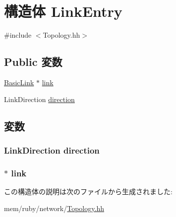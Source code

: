 \hypertarget{structLinkEntry}{
\section{構造体 LinkEntry}
\label{structLinkEntry}
}


{\ttfamily \#include $<$Topology.hh$>$}\subsection*{Public 変数}
\begin{DoxyCompactItemize}
\item 
\hyperlink{classBasicLink}{BasicLink} $\ast$ \hyperlink{structLinkEntry_ae05f4896b500322fa4ef9ea2c854bb8f}{link}
\item 
LinkDirection \hyperlink{structLinkEntry_ac6d812eedeb521eb5c2e65d07b046c4c}{direction}
\end{DoxyCompactItemize}


\subsection{変数}
\hypertarget{structLinkEntry_ac6d812eedeb521eb5c2e65d07b046c4c}{
\subsubsection[{direction}]{\setlength{\rightskip}{0pt plus 5cm}LinkDirection {\bf direction}}}
\label{structLinkEntry_ac6d812eedeb521eb5c2e65d07b046c4c}
\hypertarget{structLinkEntry_ae05f4896b500322fa4ef9ea2c854bb8f}{
\subsubsection[{link}]{$\ast$ {\bf link}}}
\label{structLinkEntry_ae05f4896b500322fa4ef9ea2c854bb8f}


この構造体の説明は次のファイルから生成されました:\begin{DoxyCompactItemize}
\item 
mem/ruby/network/\hyperlink{Topology_8hh}{Topology.hh}\end{DoxyCompactItemize}
